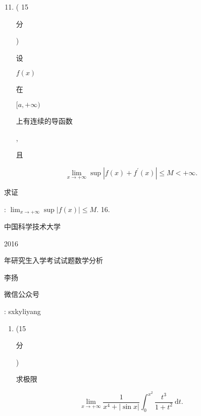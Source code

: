 \documentclass[10pt]{article}
\begin{document}
\begin{enumerate}
  \setcounter{enumi}{10}
  \item ( 15 \begin{CJK}{UTF8}{mj}分\end{CJK}) \begin{CJK}{UTF8}{mj}设\end{CJK} $f(x)$ \begin{CJK}{UTF8}{mj}在\end{CJK} $[a,+\infty)$ \begin{CJK}{UTF8}{mj}上有连续的导函数\end{CJK}, \begin{CJK}{UTF8}{mj}且\end{CJK}
\end{enumerate}
$$
\lim _{x \rightarrow+\infty} \sup \left|f(x)+f^{\prime}(x)\right| \leqslant M<+\infty .
$$
\begin{CJK}{UTF8}{mj}求证\end{CJK}: $\lim _{x \rightarrow+\infty} \sup |f(x)| \leqslant M$. 16. \begin{CJK}{UTF8}{mj}中国科学技术大学\end{CJK} 2016 \begin{CJK}{UTF8}{mj}年研究生入学考试试题数学分析\end{CJK}

\begin{CJK}{UTF8}{mj}李扬\end{CJK}

\begin{CJK}{UTF8}{mj}微信公众号\end{CJK}: sxkyliyang

\begin{enumerate}
  \item (15 \begin{CJK}{UTF8}{mj}分\end{CJK}) \begin{CJK}{UTF8}{mj}求极限\end{CJK}
\end{enumerate}
$$
\lim _{x \rightarrow+\infty} \frac{1}{x^{4}+|\sin x|} \int_{0}^{x^{2}} \frac{t^{3}}{1+t^{2}} \mathrm{~d} t .
$$
\end{document}
